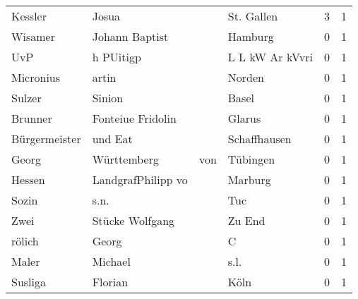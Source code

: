 \begin{tabular}{llllrr}
                  Kessler &                              Josua &             &                                  St. Gallen &          3 &         1 \\
                  Wisamer &                     Johann Baptist &             &                                     Hamburg &          0 &         1 \\
                      UvP &                          h PUitigp &             &                             L L kW Ar kVvri &          0 &         1 \\
                Micronius &                              artin &             &                                      Norden &          0 &         1 \\
                   Sulzer &                             Sinion &             &                                       Basel &          0 &         1 \\
                  Brunner &                  Fonteiue Fridolin &             &                                      Glarus &          0 &         1 \\
            Bürgermeister &                            und Eat &             &                                Schaffhausen &          0 &         1 \\
                    Georg &                        Württemberg &         von &                                    Tübingen &          0 &         1 \\
                   Hessen &                 LandgrafPhilipp vo &             &                                     Marburg &          0 &         1 \\
                    Sozin &                               s.n. &             &                                         Tuc &          0 &         1 \\
                     Zwei &                    Stücke Wolfgang &             &                                      Zu End &          0 &         1 \\
                   rölich &                              Georg &             &                                           C &          0 &         1 \\
                    Maler &                            Michael &             &                                        s.l. &          0 &         1 \\
                  Susliga &                            Florian &             &                                        Köln &          0 &         1 \\

\end{tabular}

